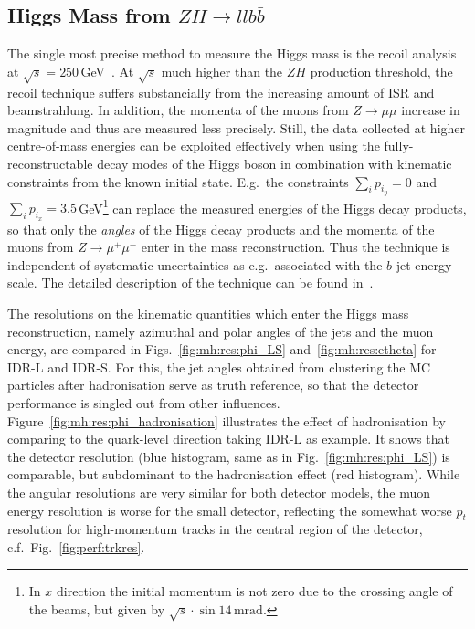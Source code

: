 \subsection{Higgs Mass from \texorpdfstring{$ZH \to ll b\bar{b}$}{ZH -> llbb}}

The single most precise method to measure the Higgs mass is the recoil analysis at $\sqrt{s}=250$\,GeV~\cite{Yan:2016xyx}. At $\sqrt{s}$ much higher than the $ZH$ production threshold, the recoil
technique suffers substancially from the increasing amount of ISR and beamstrahlung. In addition, the momenta of the muons from $Z\to \mu\mu$ increase in magnitude and thus are measured less precisely. Still, the data collected at higher centre-of-mass energies can be exploited effectively when using the fully-reconstructable decay modes of the Higgs boson in combination with kinematic constraints from the known initial state. E.g.\ the constraints $\sum_i{p_{i_y}}=0$ and $\sum_i{p_{i_x}}=3.5$\,GeV\footnote{In $x$ direction the initial momentum is not zero due to the crossing angle of the beams, but given by $\sqrt{s} \cdot \sin{14\,\mathrm{mrad}}$.} can replace the measured energies of the Higgs decay products, so that only the {\it angles} of the Higgs decay products and the momenta of the muons from $Z\to\mu^+\mu^-$ enter in the mass reconstruction. Thus the technique is independent of systematic uncertainties as e.g.\ associated with the $b$-jet energy scale. The detailed description of the technique can be found in~\cite{ILDNote:MH}.

The resolutions on the kinematic quantities which enter the Higgs mass reconstruction, namely azimuthal and polar angles of the jets and the muon energy, are compared in Figs.~\ref{fig:mh:res:phi_LS} and~\ref{fig:mh:res:etheta} for IDR-L and IDR-S. For this, 
the jet angles obtained from clustering the MC particles after hadronisation serve as truth reference, so that the detector performance is singled out from other influences.  Figure~\ref{fig:mh:res:phi_hadronisation} illustrates the effect of hadronisation by comparing to the quark-level direction taking IDR-L as example. It shows that the detector resolution (blue histogram, same as in Fig.~\ref{fig:mh:res:phi_LS}) is comparable, but
subdominant to the hadronisation effect (red histogram). While the angular resolutions are very similar for both detector models, the muon energy resolution is worse for the small detector, reflecting the somewhat worse $p_t$ resolution for high-momentum tracks in the central region of the detector, c.f.\ Fig.~\ref{fig:perf:trkres}. 
 
